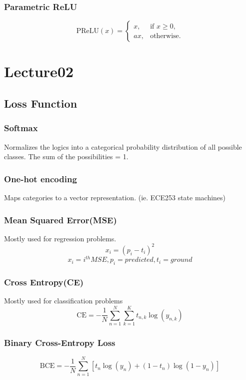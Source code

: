 \documentclass[11pt, english]{article}
\begin{document}
\subsubsection*{Parametric ReLU}
\[
\text{PReLU}(x) = 
\begin{cases} 
x, & \text{if } x \geq 0, \\
a x, & \text{otherwise.}
\end{cases}
\]

\section{Lecture02}
\subsection{Loss Function}
\subsubsection{Softmax}
Normalizes the logics into a categorical probability distribution  of all possible classes.
The sum of the possibilities = 1.
\subsubsection{One-hot encoding}
Maps categories to a vector representation. (ie. ECE253 state machines)
\subsubsection{Mean Squared Error(MSE)}
Mostly used for regression problems.
\[x_i = (p_i - t_i)^2\]
\[x_i = i^{th} MSE , p_i = predicted, t_i = ground \]
\subsubsection{Cross Entropy(CE)}
Mostly used for classification problems
\[
\text{CE} = -\frac{1}{N} \sum_{n=1}^{N} \sum_{k=1}^{K} t_{n,k} \log(y_{n,k})
\]
\subsubsection*{Binary Cross-Entropy Loss}
\[
\text{BCE} = -\frac{1}{N} \sum_{n=1}^{N} \left[ t_n \log(y_n) + (1 - t_n) \log(1 - y_n) \right]
\]
\end{document}
